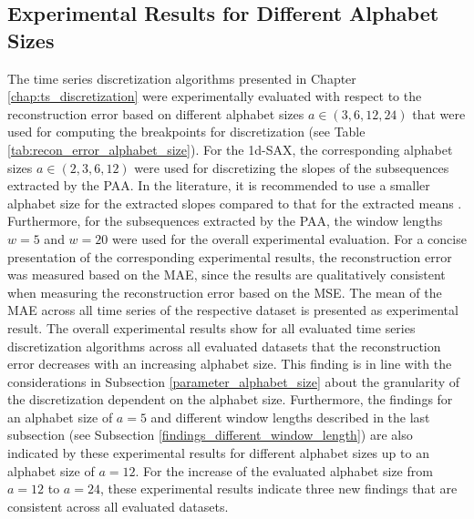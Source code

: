 \subsection*{Experimental Results for Different Alphabet Sizes}
The time series discretization algorithms presented in Chapter \ref{chap:ts_discretization} were experimentally evaluated with respect to the reconstruction error based on different alphabet sizes $a \in (3,6,12,24)$ that were used for computing the breakpoints for discretization (see Table \ref{tab:recon_error_alphabet_size}). For the \ac{1d-SAX}, the corresponding alphabet sizes $a \in (2,3,6,12)$ were used for discretizing the slopes of the subsequences extracted by the \ac{PAA}. In the literature, it is recommended to use a smaller alphabet size for the extracted slopes compared to that for the extracted means \cite{1d-SAX}. Furthermore, for the subsequences extracted by the \ac{PAA}, the window lengths $w = 5$ and $w = 20$ were used for the overall experimental evaluation. For a concise presentation of the corresponding experimental results, the reconstruction error was measured based on the \ac{MAE}, since the results are qualitatively consistent when measuring the reconstruction error based on the \ac{MSE}. The mean of the MAE across all time series of the respective dataset is presented as experimental result. \newline
The overall experimental results show for all evaluated time series discretization algorithms across all evaluated datasets that the reconstruction error decreases with an increasing alphabet size. This finding is in line with the considerations in Subsection \ref{parameter_alphabet_size} about the granularity of the discretization dependent on the alphabet size. Furthermore, the findings for an alphabet size of $a = 5$ and different window lengths described in the last subsection (see Subsection \ref{findings_different_window_length}) are also indicated by these experimental results for different alphabet sizes up to an alphabet size of $a = 12$. For the increase of the evaluated alphabet size from $a = 12$ to $a = 24$, these experimental results indicate three new findings that are consistent across all evaluated datasets. \newline
